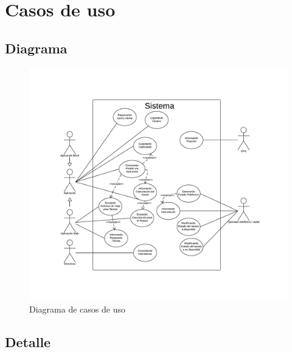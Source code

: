 \documentclass[a4paper, 10pt, twoside]{article}
\begin{document}


\newpage


\section{Casos de uso}


\subsection{Diagrama}

\begin{figure}[H]
  \includegraphics[type=png,ext=.png,read=.png,width=\textwidth]{diagramas/cu}%
  \caption{Diagrama de casos de uso}
  \label{fig:diagrama-casos-de-uso}
\end{figure}


\subsection{Detalle}

\end{document}
